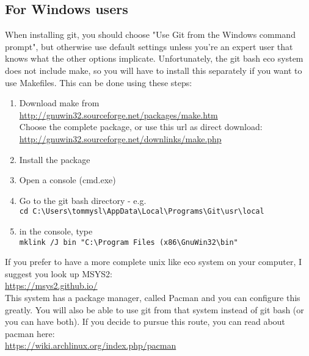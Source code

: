 \documentclass[10pt,a4paper]{article}
\begin{document}
\subsection{For Windows users}
When installing git, you should choose "Use Git from the Windows command prompt", but otherwise use default settings unless you're an expert user that knows what the other options implicate. Unfortunately, the git bash eco system does not include make, so you will have to install this separately if you want to use Makefiles. This can be done using these steps:
\begin{enumerate}
\item Download make from\\\url{http://gnuwin32.sourceforge.net/packages/make.htm}\\Choose the complete package, or use this url as direct download:\\ \url{http://gnuwin32.sourceforge.net/downlinks/make.php}
\item Install the package
\item Open a console (cmd.exe)
\item Go to the git bash directory - e.g.\\\texttt{cd C:\textbackslash{}Users\textbackslash{}tommysl\textbackslash{}AppData\textbackslash{}Local\textbackslash{}Programs\textbackslash{}Git\textbackslash{}usr\textbackslash{}local}
\item in the console, type\\
\texttt{mklink /J bin "C:\textbackslash{}Program Files (x86\textbackslash{}GnuWin32\textbackslash{}bin"}
\end{enumerate}
If you prefer to have a more complete unix like eco system on your computer, I suggest you look up MSYS2:\\
\url{https://msys2.github.io/}\\
This system has a package manager, called Pacman and you can configure this greatly. You will also be able to use git from that system instead of git bash (or you can have both). If you decide to pursue this route, you can read about pacman here:\\
\url{https://wiki.archlinux.org/index.php/pacman}
\end{document}
